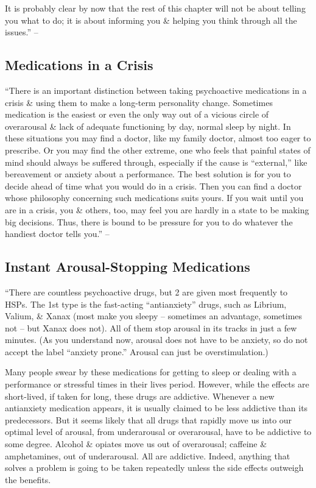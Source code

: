 \documentclass{article}
\numberwithin{equation}{section}
\begin{document}
It is probably clear by now that the rest of this chapter will not be about telling you what to do; it is about informing you \& helping you think through all the issues.'' -- \cite[pp. 226--227]{Aron2013}

\subsection{Medications in a Crisis}
``There is an important distinction between taking psychoactive medications in a crisis \& using them to make a long-term personality change. Sometimes medication is the easiest or even the only way out of a vicious circle of overarousal \& lack of adequate functioning by day, normal sleep by night. In these situations you may find a doctor, like my family doctor, almost too eager to prescribe. Or you may find the other extreme, one who feels that painful states of mind should always be suffered through, especially if the cause is ``external,'' like bereavement or anxiety about a performance. The best solution is for you to decide ahead of time what you would do in a crisis. Then you can find a doctor whose philosophy concerning such medications suits yours. If you wait until you are in a crisis, you \& others, too, may feel you are hardly in a state to be making big decisions. Thus, there is bound to be pressure for you to do whatever the handiest doctor tells you.'' -- \cite[pp. 226--227]{Aron2013}

\subsection{Instant Arousal-Stopping Medications}
``There are countless psychoactive drugs, but 2 are given most frequently to HSPs. The 1st type is the fast-acting ``antianxiety'' drugs, such as Librium, Valium, \& Xanax (most make you sleepy -- sometimes an advantage, sometimes not -- but Xanax does not). All of them stop arousal in its tracks in just a few minutes. (As you understand now, arousal does not have to be anxiety, so do not accept the label ``anxiety prone.'' Arousal can just be overstimulation.)

Many people swear by these medications for getting to sleep or dealing with a performance or stressful times in their lives period. However, while the effects are short-lived, if taken for long, these drugs are addictive. Whenever a new antianxiety medication appears, it is usually claimed to be less addictive than its predecessors. But it seems likely that all drugs that rapidly move us into our optimal level of arousal, from underarousal or overarousal, have to be addictive to some degree. Alcohol \& opiates move us out of overarousal; caffeine \& amphetamines, out of underarousal. All are addictive. Indeed, anything that solves a problem is going to be taken repeatedly unless the side effects outweigh the benefits.
\end{document}
